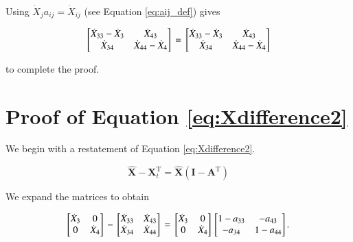 \documentclass[authoryear,preprint,review,12pt]{elsarticle}
\let\oldhat\hat
\renewcommand{\vec}[1]{\mathbf{#1}}
\renewcommand{\hat}[1]{\oldhat{\mathbf{#1}}}
\begin{document}
\noindent Using $\dot{X}_j a_{ij} = \dot{X}_{ij}$ (see Equation \ref{eq:aij_def}) gives

\begin{equation} \label{eq:Xdifference1Proof-4}
\begin{bmatrix} 	\dot{X}_{33} - \dot{X}_3 & \dot{X}_{43}	\\
				\dot{X}_{34} & \dot{X}_{44} - \dot{X}_4	\\
\end{bmatrix} \\
= \\
\begin{bmatrix} 	\dot{X}_{33} - \dot{X}_3 & \dot{X}_{43}	\\
				\dot{X}_{34} & \dot{X}_{44} - \dot{X}_4	\\
\end{bmatrix}
\end{equation}

\noindent to complete the proof.

\section{Proof of Equation \ref{eq:Xdifference2}}

We begin with a restatement of Equation \ref{eq:Xdifference2}.

\begin{equation} \label{eq:Xdifference2Proof-1}
	\hat{\vec{X}} - \vec{X}_t^\mathrm{T} = \hat{\vec{X}}(\vec{I} - \vec{A}^\mathrm{T})
\end{equation}

\noindent We expand the matrices to obtain

\begin{equation} \label{eq:Xdifference2Proof-2}
\begin{bmatrix} 	\dot{X}_{3} & 0	\\
				0 & \dot{X}_{4}	\\
\end{bmatrix} \\
 - \\
\begin{bmatrix} 	\dot{X}_{33} & \dot{X}_{43}	\\
				\dot{X}_{34} & \dot{X}_{44}	\\
\end{bmatrix} \\
= \\
\begin{bmatrix} 	\dot{X}_{3} & 0	\\
				0 & \dot{X}_{4}	\\
\end{bmatrix} \\
\begin{bmatrix} 	1 - a_{33} & -a_{43}	\\
				-a_{34} & 1 - a_{44}	\\
\end{bmatrix}.
\end{equation}
\end{document}
